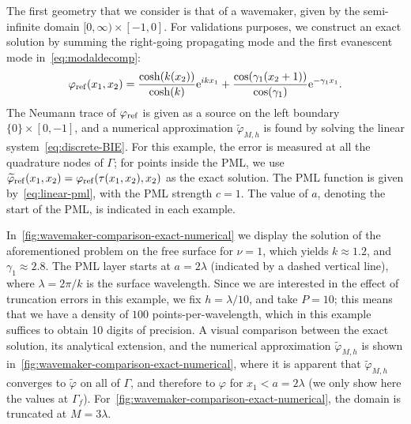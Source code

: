 \documentclass[review,hidelinks,onefignum,onetabnum]{siamart220329}
\newcommand{\e}{\mathrm{e}}
\newcommand{\tvarphi}{\widetilde \varphi}
\begin{document}
The first geometry that we consider is that of a wavemaker, given by the semi-infinite domain $[0,\infty) \times [-1,0]$. For validations purposes, we construct an exact solution by summing the right-going propagating mode and the first evanescent mode in~\cref{eq:modaldecomp}:
\begin{align}
    \label{eq:ref-solution-wavemaker}
  \varphi_{\rm ref}(x_1,x_2) = \frac{\cosh(k(x_2))}{\cosh(k)} \e^{i k x_1} + \frac{\cos(\gamma_1(x_2+1))}{\cos(\gamma_1)} \e^{-\gamma_1 x_1}.
\end{align}
%
The Neumann trace of $\varphi_{\rm ref}$ is given as a source on the left boundary $\{ 0 \} \times[0,-1]$, and a numerical approximation $\tvarphi_{M,h}$ is found by solving the linear system~\cref{eq:discrete-BIE}. For this example, the error is measured at all the quadrature nodes of $\Gamma$; for points inside the PML, we use $\tvarphi_{\rm ref}(x_1,x_2) = \varphi_{\rm ref}(\tau(x_1,x_2),x_2)$ as the exact solution. The PML function is given by~\cref{eq:linear-pml}, with the PML strength $c=1$. The value of $a$, denoting the start of the PML, is indicated in each example. 

In~\cref{fig:wavemaker-comparison-exact-numerical} we display the solution of the aforementioned problem on the free surface for $\nu=1$, which yields $k \approx 1.2$, and $\gamma_1 \approx 2.8$. The PML layer starts at $a=2\lambda$ (indicated by a dashed vertical line), where $\lambda = 2\pi/k$ is the surface wavelength. Since we are interested in the effect of truncation errors in this example, we fix $h = \lambda/10$, and take $P=10$; this means that we have a density of $100$ points-per-wavelength, which in this example suffices to obtain 10 digits of precision. A visual comparison between the exact solution, its analytical extension, and the numerical approximation $\tvarphi_{M,h}$ is shown in~\cref{fig:wavemaker-comparison-exact-numerical}, where it is apparent that $\tvarphi_{M,h}$ converges to $\tvarphi$ on all of $\Gamma$, and therefore to $\varphi$ for $x_1 < a = 2\lambda$ (we only show here the values at $\Gamma_f$). For~\cref{fig:wavemaker-comparison-exact-numerical}, the domain is truncated at $M=3\lambda$. 
\end{document}
